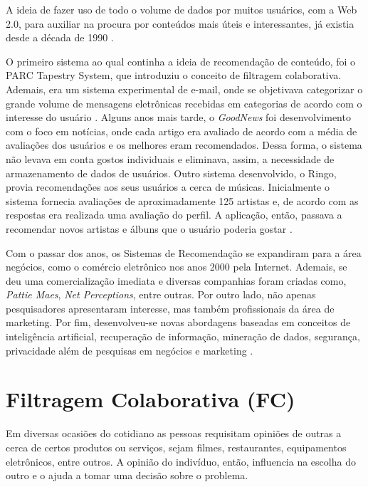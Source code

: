 A ideia de fazer uso de todo o volume de dados por muitos usuários, com a Web 2.0, para auxiliar na procura por conteúdos mais úteis e interessantes, já existia desde a década de 1990 \cite{Jannach2010}.

O primeiro sistema ao qual continha a ideia de recomendação de conteúdo, foi o PARC Tapestry System, que introduziu o conceito de filtragem colaborativa. Ademais, era um sistema experimental de e-mail, onde se objetivava categorizar o grande volume de mensagens eletrônicas recebidas em categorias de acordo com o interesse do usuário \cite{Goldberg1992}.
Alguns anos mais tarde, o \textit{GoodNews} foi desenvolvimento com o foco em notícias, onde cada artigo era avaliado de acordo com a média de avaliações dos usuários e os melhores eram recomendados. Dessa forma, o sistema não levava em conta gostos individuais e eliminava, assim, a necessidade de armazenamento de dados de usuários.
Outro sistema desenvolvido, o Ringo, provia recomendações aos seus usuários a cerca de músicas. Inicialmente o sistema fornecia avaliações de aproximadamente 125 artistas e, de acordo com as respostas era realizada uma avaliação do perfil. A aplicação, então, passava a recomendar novos artistas e álbuns que o usuário poderia gostar \cite{Resnick1994}.

Com o passar dos anos, os Sistemas de Recomendação se expandiram para a área negócios, como o comércio eletrônico nos anos 2000 pela Internet. Ademais, se deu uma comercialização imediata e diversas companhias foram criadas como, \textit{Pattie Maes}, \textit{Net Perceptions}, entre outras. Por outro lado, não apenas pesquisadores apresentaram interesse, mas também profissionais da área de marketing. Por fim, desenvolveu-se novas abordagens baseadas em conceitos de inteligência artificial, recuperação de informação, mineração de dados, segurança, privacidade além de pesquisas em negócios e marketing \cite{Jannach2010}.



\section{Filtragem Colaborativa (FC)} \label{sec:filtragem-colaborativa}
    
    Em diversas ocasiões do cotidiano as pessoas requisitam opiniões de outras a cerca de certos produtos ou serviços, sejam filmes, restaurantes, equipamentos eletrônicos, entre outros. A opinião do indivíduo, então, influencia na escolha do outro e o ajuda a tomar uma decisão sobre o problema. 
    

